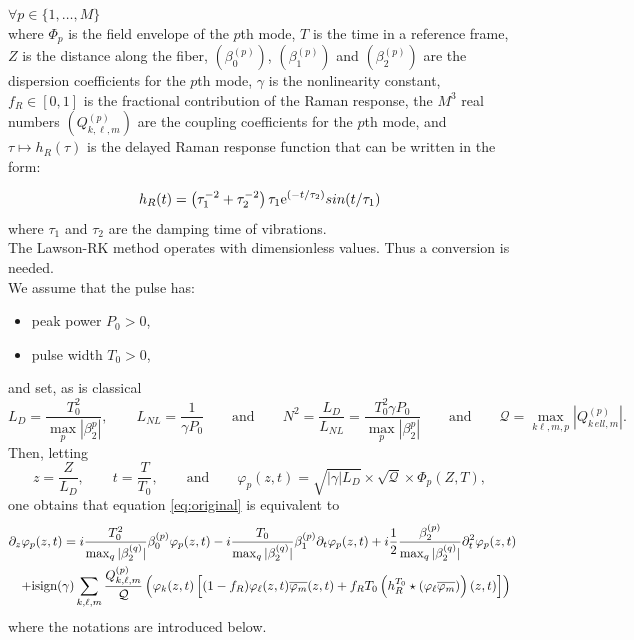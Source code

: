 \documentclass[11pt]{amsart}
\newcommand{\ii}{{\rm i}}
\begin{document}
$\forall p\in\{1,\dots,M\}$ \\

where $\Phi_{p}$ is the field envelope of the $p$th mode, $T$ is the time in a reference frame, $Z$ is the distance along the fiber, $(\beta_0^{(p)})$, $(\beta_1^{(p)})$ and $(\beta_2^{(p)})$ are the dispersion coefficients for the $p$th mode, $\gamma$ is the nonlinearity constant, $f_R\in[0,1]$ is the fractional contribution of the Raman response, the $M^3$ real numbers $(Q^{(p)}_{k,\ell,m})$ are the coupling coefficients for the $p$th mode, and $\tau \mapsto h_R(\tau)$ is the delayed Raman response function that can be written in the form:

\begin{equation}
  \label{eq:raman}
  h_R(t) = \left( \tau_1^{-2} + \tau_2^{-2} \right) \tau_1 {\rm e}^{(-t/\tau_2)} sin(t/\tau_1)
\end{equation}
where $\tau_1$ and $\tau_2$ are the damping time of vibrations. \\

The Lawson-RK method operates with dimensionless values. Thus a conversion is needed. \\

We assume that the pulse has:
\begin{itemize}
  \item peak power $P_0>0$,
  \item pulse width $T_0>0$,
\end{itemize}
and set, as is classical
\begin{equation*}
  L_D = \frac{T_0^2}{\max_p |\beta_2^p|},
  \qquad
  L_{NL} = \frac{1}{\gamma P_0}
  \qquad \text{and} \qquad
  N^2 = \frac{L_D}{L_{NL}} = \frac{T_0^2 \gamma P_0}{\max_p |\beta_2^p|}
  \qquad \text{and} \qquad
  \mathcal Q = \max_{k\ell,m,p} |Q_{k\,ell,m}^{(p)}|.
\end{equation*}
Then, letting
\begin{equation*}
  z=\frac{Z}{L_D},
  \qquad
  t=\frac{T}{T_0},
  \qquad\text{and}\qquad
  \varphi_p (z,t) = \sqrt{|\gamma| L_D} \times \sqrt{\mathcal Q} \times \Phi_p(Z,T),
\end{equation*}
one obtains that equation \eqref{eq:original} is equivalent to
\begin{eqnarray}
  \label{eq:originaldimensionless}
  \lefteqn{\partial_z \varphi_p(z,t) =
  i \frac{T_0^2}{\max_q |\beta_2^{(q)}|} \beta_0^{(p)} \varphi_p(z,t)
  - i \frac{T_0}{\max_q |\beta_2^{(q)}|} \beta_1^{(p)} \partial_t \varphi_p(z,t)
  + i \frac12 \frac{\beta_2^{(p)}}{\max_q |\beta_2^{(q)}|}\partial_t^2 \varphi_p(z,t)} \\
  & & +\ii \text{sign}(\gamma) \sum_{k,\ell,m} \frac{Q^{(p)}_{k,\ell,m}}{\mathcal Q}
  \left(\varphi_k (z,t) \left[(1-f_R)\varphi_\ell (z,t)\overline{\varphi_m}(z,t) 
  + f_RT_0\left(h_R^{T_0}\star(\varphi_\ell\overline{\varphi_m})\right)(z,t)\right]\right) \nonumber
\end{eqnarray}
where the notations are introduced below.
\end{document}
